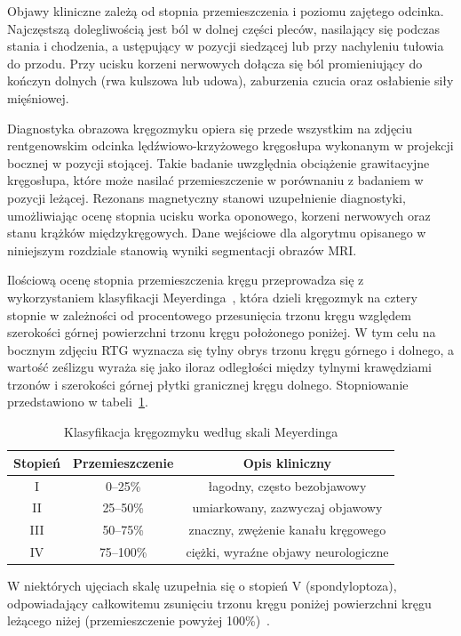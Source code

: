 Objawy kliniczne zależą od stopnia przemieszczenia i poziomu zajętego odcinka.
Najczęstszą dolegliwością jest ból w dolnej części pleców, nasilający się podczas stania i chodzenia, a ustępujący w pozycji siedzącej lub przy nachyleniu tułowia do przodu.
Przy ucisku korzeni nerwowych dołącza się ból promieniujący do kończyn dolnych (rwa kulszowa lub udowa), zaburzenia czucia oraz osłabienie siły mięśniowej.

Diagnostyka obrazowa kręgozmyku opiera się przede wszystkim na zdjęciu rentgenowskim odcinka  lędźwiowo-krzyżowego kręgosłupa wykonanym w projekcji bocznej w pozycji stojącej.
Takie badanie uwzględnia obciążenie grawitacyjne kręgosłupa, które może nasilać przemieszczenie w porównaniu z badaniem w pozycji leżącej.
Rezonans magnetyczny stanowi uzupełnienie diagnostyki, umożliwiając ocenę stopnia ucisku worka oponowego, korzeni nerwowych oraz stanu krążków międzykręgowych.
Dane wejściowe dla algorytmu opisanego w niniejszym rozdziale stanowią wyniki segmentacji obrazów MRI.

Ilościową ocenę stopnia przemieszczenia kręgu przeprowadza się z wykorzystaniem klasyfikacji Meyerdinga~\cite{koslosky}, która dzieli kręgozmyk na cztery stopnie w zależności od procentowego przesunięcia trzonu kręgu względem szerokości górnej powierzchni trzonu kręgu położonego poniżej.
W tym celu na bocznym zdjęciu RTG wyznacza się tylny obrys trzonu kręgu górnego i dolnego, a wartość ześlizgu wyraża się jako iloraz odległości między tylnymi krawędziami trzonów i szerokości górnej płytki granicznej kręgu dolnego.
Stopniowanie przedstawiono w tabeli~\ref{tab:meyerding}.

\begin{table}[H]
\centering
\caption{Klasyfikacja kręgozmyku według skali Meyerdinga}
\label{tab:meyerding}
\begin{tabular}{ccc}
\hline
\textbf{Stopień} & \textbf{Przemieszczenie} & \textbf{Opis kliniczny} \\
\hline
I   & 0--25\%   & łagodny, często bezobjawowy \\
II  & 25--50\%  & umiarkowany, zazwyczaj objawowy \\
III & 50--75\%  & znaczny, zwężenie kanału kręgowego \\
IV  & 75--100\% & ciężki, wyraźne objawy neurologiczne \\
\hline
\end{tabular}
\end{table}

W niektórych ujęciach skalę uzupełnia się o stopień V (spondyloptoza), odpowiadający całkowitemu zsunięciu trzonu kręgu poniżej powierzchni kręgu leżącego niżej (przemieszczenie powyżej 100\%)~\cite{koslosky}.

